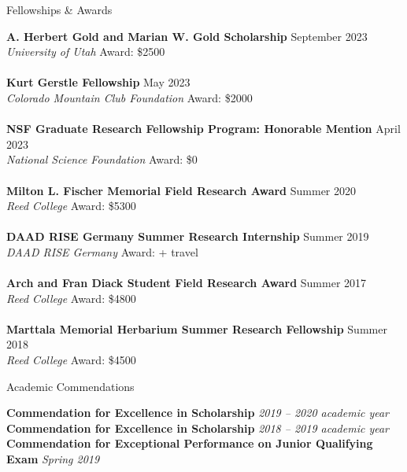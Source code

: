 \documentclass{resume} %
\begin{document}
\begin{rSection}{Fellowships \& Awards}

{\bf A. Herbert Gold and Marian W. Gold Scholarship} \hfill {September 2023} \\ 
{\em University of Utah} \textbar \space Award: \$2500 
\\ \\
{\bf Kurt Gerstle Fellowship} \hfill {May 2023} \\ 
{\em Colorado Mountain Club Foundation} \textbar \space Award: \$2000 
\\ \\
{\bf NSF Graduate Research Fellowship Program: Honorable Mention} \hfill {April 2023} \\ 
{\em National Science Foundation} \textbar \space Award: \$0 
\\ \\
{\bf Milton L. Fischer Memorial Field Research Award} \hfill {Summer 2020} \\ 
{\em Reed College} \textbar \space Award: \$5300
\\ \\
{\bf DAAD RISE Germany Summer Research Internship} \hfill {Summer 2019} \\ 
{\em DAAD RISE Germany} \textbar \space Award:  + travel
\\ \\
{\bf Arch and Fran Diack Student Field Research Award} \hfill {Summer 2017} \\ 
{\em Reed College} \textbar \space Award: \$4800
\\ \\
{\bf Marttala Memorial Herbarium Summer Research Fellowship} \hfill {Summer 2018} \\ 
{\em Reed College} \textbar \space Award: \$4500
\smallskip
\end{rSection}

\begin{rSection}{Academic Commendations}

{\bf Commendation for Excellence in Scholarship} \hfill {\em 2019 -- 2020 academic year} \smallskip \\ 
{\bf Commendation for Excellence in Scholarship} \hfill {\em 2018 -- 2019 academic year} \smallskip \\ 
{\bf Commendation for Exceptional Performance on Junior Qualifying Exam} \hfill {\em Spring 2019} 
\smallskip
\end{rSection}
\end{document}
